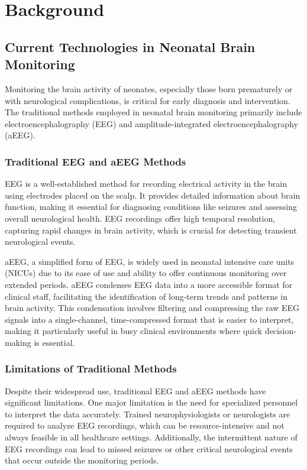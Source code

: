 \documentclass[12pt,journal,compsoc]{IEEEtran}
\begin{document}
\section{Background}

\subsection{Current Technologies in Neonatal Brain Monitoring}

Monitoring the brain activity of neonates, especially those born prematurely or with neurological complications, is critical for early diagnosis and intervention. The traditional methods employed in neonatal brain monitoring primarily include electroencephalography (EEG) and amplitude-integrated electroencephalography (aEEG).

\subsubsection{Traditional EEG and aEEG Methods}

EEG is a well-established method for recording electrical activity in the brain using electrodes placed on the scalp. It provides detailed information about brain function, making it essential for diagnosing conditions like seizures and assessing overall neurological health. EEG recordings offer high temporal resolution, capturing rapid changes in brain activity, which is crucial for detecting transient neurological events.

aEEG, a simplified form of EEG, is widely used in neonatal intensive care units (NICUs) due to its ease of use and ability to offer continuous monitoring over extended periods. aEEG condenses EEG data into a more accessible format for clinical staff, facilitating the identification of long-term trends and patterns in brain activity. This condensation involves filtering and compressing the raw EEG signals into a single-channel, time-compressed format that is easier to interpret, making it particularly useful in busy clinical environments where quick decision-making is essential.

\subsubsection{Limitations of Traditional Methods}

Despite their widespread use, traditional EEG and aEEG methods have significant limitations. One major limitation is the need for specialized personnel to interpret the data accurately. Trained neurophysiologists or neurologists are required to analyze EEG recordings, which can be resource-intensive and not always feasible in all healthcare settings. Additionally, the intermittent nature of EEG recordings can lead to missed seizures or other critical neurological events that occur outside the monitoring periods.
\end{document}
